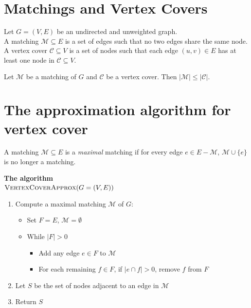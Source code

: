 \documentclass[11  pt]{article}
\begin{document}
	\newpage
	\section{Matchings and Vertex Covers}
	Let $G = (V,E)$ be an undirected and unweighted graph. \\
	
	A matching $\mathcal{M} \subseteq E$ is a set of edges such that no two edges share the same node. \\ 
	
	A vertex cover $\mathcal{C} \subseteq V$ is a set of nodes such that each edge $(u,v) \in E$ has at least one node in $\mathcal{C} \subseteq V$.\\
	\vspace{5cm} 
	
	
	\begin{lemma}
		Let $\mathcal{M}$ be a matching of $G$ and $\mathcal{C}$ be a vertex cover. Then $|\mathcal{M}| \leq |\mathcal{C}|$.
	\end{lemma}

	
	

	
	\newpage
	\section{The approximation algorithm for vertex cover}
	A matching $\mathcal{M} \subseteq E$ is a \emph{maximal} matching if for every edge $e \in E - \mathcal{M}$, $\mathcal{M} \cup \{e\}$ is no longer a matching. \\
	
	
	\vspace{8cm}
	
	
	\textbf{The algorithm}\\
	
	$\textsc{VertexCoverApprox}(G = (V,E))$
	\begin{enumerate}
		\item Compute a maximal matching $\mathcal{M}$ of $G$:
		\begin{itemize}
			\item Set $F = E$, $\mathcal{M} = \emptyset$
			\item While $|F| > 0$
			\begin{itemize}
				\item Add any edge $e \in F$ to $\mathcal{M}$
				\item For each remaining $f \in F$, if $|e \cap f| > 0$, remove $f$ from $F$
			\end{itemize}
		\end{itemize}
		\item Let $S$ be the set of nodes adjacent to an edge in $\mathcal{M}$
		\item Return $S$\\
	\end{enumerate}
	
\end{document}
